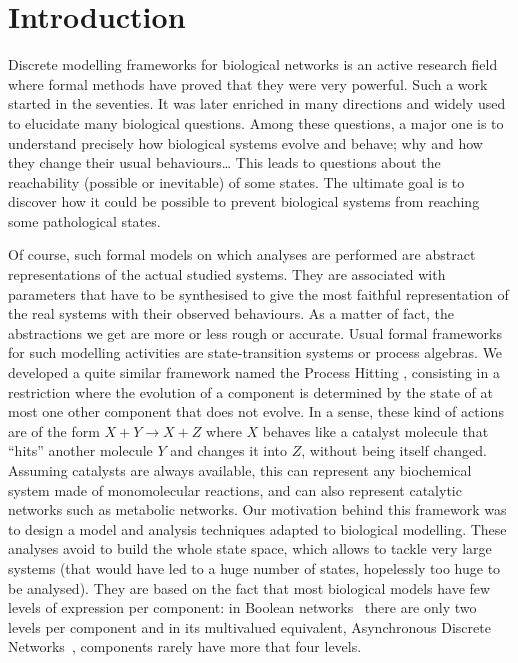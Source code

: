 \section{Introduction}
\label{sec:intro}

Discrete modelling frameworks for biological networks is an active research field where formal methods have proved that they were very powerful.
Such a work started in the seventies.
It was later enriched in many directions and widely used to elucidate many biological questions.
Among these questions, a major one is to understand precisely how biological systems evolve and behave; why and how they change their usual behaviours…
This leads to questions about the reachability (possible or inevitable) of some states.
The ultimate goal is to discover how it could be possible to prevent biological systems from reaching some pathological states.

Of course, such formal models on which analyses are performed are abstract representations of the actual studied systems.
They are associated with parameters that have to be synthesised %
to give the most faithful representation of the real systems with their observed behaviours.
As a matter of fact, the abstractions we get are more or less rough or accurate.
Usual formal frameworks for such modelling activities are state-transition systems or process algebras. %
We developed a quite similar framework named the Process Hitting \cite{PMR10-TCSB},
consisting in a restriction where the evolution of a component is determined by the state of at most one other component that does not evolve.
In a sense, these kind of actions are of the form $X + Y \rightarrow X + Z$ where $X$ behaves like a catalyst molecule that “hits” another molecule $Y$ and changes it into $Z$, without being itself changed.
Assuming catalysts are always available, this can represent any biochemical system made of monomolecular reactions, and can also represent catalytic networks such as metabolic networks.
Our motivation behind this framework was to design a model and analysis techniques adapted to biological modelling.
These analyses avoid to build the whole state space, which allows to tackle very large systems (that would have led to a huge number of states, hopelessly too huge to be analysed).
They are based on the fact that most biological models have few levels of expression per component:
in Boolean networks~\cite{kauffman69,Thomas73} there are only two levels per component and in its multivalued equivalent, Asynchronous Discrete Networks~\cite{deJong02}, components rarely have more that four levels.

